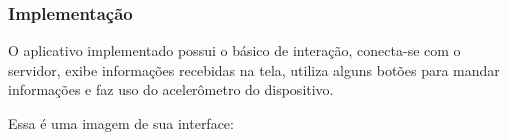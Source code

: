 \documentclass[a4paper,12pt]{article}
\begin{document}




\subsubsection{Implementação}

O aplicativo implementado possui o básico de interação, conecta-se com o servidor, exibe informações recebidas na tela, utiliza alguns botões para mandar informações e faz uso do acelerômetro do dispositivo.

Essa é uma imagem de sua interface:
\end{document}
